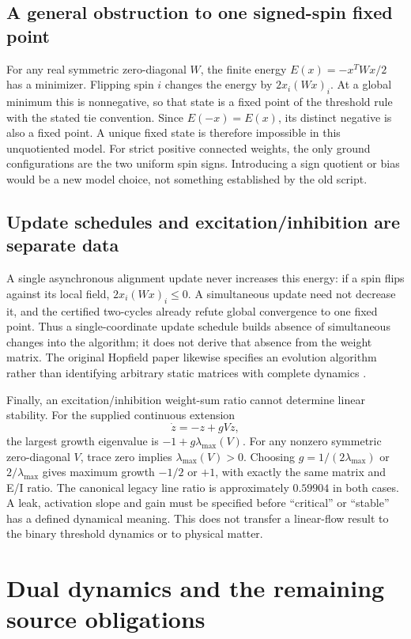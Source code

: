 \documentclass[11pt,a4paper]{article}
\begin{document}
\subsection{A general obstruction to one signed-spin fixed point}

For any real symmetric zero-diagonal $W$, the finite energy
$E(x)=-x^TWx/2$ has a minimizer. Flipping spin $i$ changes the energy by
$2x_i(Wx)_i$. At a global minimum this is nonnegative, so that state is a
fixed point of the threshold rule with the stated tie convention.
Since $E(-x)=E(x)$, its distinct negative is also a fixed point. A unique
fixed state is therefore impossible in this unquotiented model. For strict
positive connected weights, the only ground configurations are the two
uniform spin signs. Introducing a sign quotient or bias would be a new
model choice, not something established by the old script.

\subsection{Update schedules and excitation/inhibition are separate data}

A single asynchronous alignment update never increases this energy:
if a spin flips against its local field, $2x_i(Wx)_i\le0$. A simultaneous
update need not decrease it, and the certified two-cycles already refute
global convergence to one fixed point. Thus a single-coordinate update
schedule builds absence of simultaneous changes into the algorithm; it
does not derive that absence from the weight matrix. The original Hopfield
paper likewise specifies an evolution algorithm rather than identifying
arbitrary static matrices with complete dynamics \cite{hopfield}.

Finally, an excitation/inhibition weight-sum ratio cannot determine linear
stability. For the supplied continuous extension
\[
 \dot z=-z+gVz,
\]
the largest growth eigenvalue is $-1+g\lambda_{\max}(V)$.
For any nonzero symmetric zero-diagonal $V$, trace zero implies
$\lambda_{\max}(V)>0$. Choosing
$g=1/(2\lambda_{\max})$ or $2/\lambda_{\max}$ gives maximum growth
$-1/2$ or $+1$, with exactly the same matrix and E/I ratio. The canonical
legacy line ratio is approximately $0.59904$ in both cases. A leak,
activation slope and gain must be specified before ``critical'' or
``stable'' has a defined dynamical meaning. This does not transfer a
linear-flow result to the binary threshold dynamics or to physical matter.

\section{Dual dynamics and the remaining source obligations}
\end{document}
